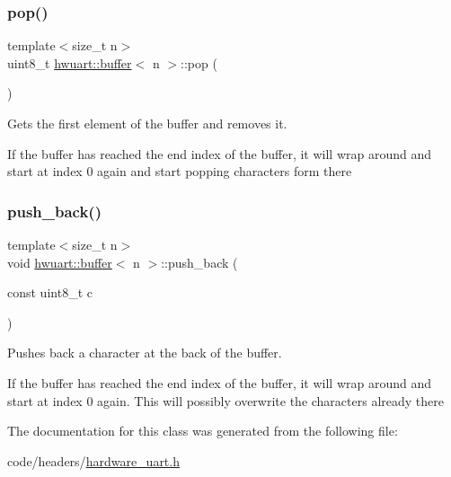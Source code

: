 \subsubsection{\texorpdfstring{pop()}{pop()}}
{\footnotesize\ttfamily template$<$size\+\_\+t n$>$ \\
uint8\+\_\+t \hyperlink{classhwuart_1_1buffer}{hwuart\+::buffer}$<$ n $>$\+::pop (\begin{DoxyParamCaption}{ }\end{DoxyParamCaption})\hspace{0.3cm}{\ttfamily [inline]}}



Gets the first element of the buffer and removes it. 

If the buffer has reached the end index of the buffer, it will wrap around and start at index 0 again and start popping characters form there \mbox{\label{classhwuart_1_1buffer_aa72858218a0fbf6c1d4d9fa72ea557da}} 
\subsubsection{\texorpdfstring{push\+\_\+back()}{push\_back()}}
{\footnotesize\ttfamily template$<$size\+\_\+t n$>$ \\
void \hyperlink{classhwuart_1_1buffer}{hwuart\+::buffer}$<$ n $>$\+::push\+\_\+back (\begin{DoxyParamCaption}\item[{const uint8\+\_\+t}]{c }\end{DoxyParamCaption})\hspace{0.3cm}{\ttfamily [inline]}}



Pushes back a character at the back of the buffer. 

If the buffer has reached the end index of the buffer, it will wrap around and start at index 0 again. This will possibly overwrite the characters already there 

The documentation for this class was generated from the following file\+:\begin{DoxyCompactItemize}
\item 
code/headers/\hyperlink{hardware__uart_8h}{hardware\+\_\+uart.\+h}\end{DoxyCompactItemize}
